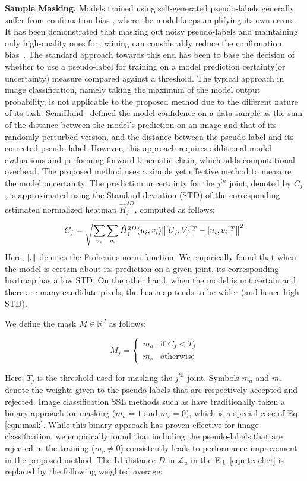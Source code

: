 \documentclass{article}
\begin{document}
\par
\textbf{Sample Masking.} Models trained using self-generated pseudo-labels generally suffer from confirmation bias \cite{tarvainen2017mean}, where the model keeps amplifying its own errors. It has been demonstrated that masking out noisy pseudo-labels and maintaining only high-quality ones for training can considerably reduce the confirmation bias~\cite{arazo2020pseudo}. The standard approach towards this end has been to base the decision of whether to use a pseudo-label for training on a model prediction certainty(or uncertainty) measure compared against a threshold. The typical approach in image classification, namely taking the maximum of the model output probability, is not applicable to the proposed method due to the different nature of its task. SemiHand~\cite{yang2021semihand} defined the model confidence on a data sample as the sum of the distance between the model's prediction on an image and that of its randomly perturbed version, and the distance between the pseudo-label and its corrected pseudo-label. However, this approach requires additional model evaluations and performing forward kinematic chain, which adds computational overhead. The proposed method uses a simple yet effective method to measure the model uncertainty. The prediction uncertainty for the $j^{th}$ joint, denoted by $C_j$, is approximated using the Standard deviation (STD) of the corresponding estimated normalized heatmap ${\hat{H}}_j^{2D}$, computed as follows:
\begin{equation}
  C_j = \sqrt{ \sum_{u_i}\sum_{v_i}{\hat{H}}_j^{2D}(u_i,v_i) \norm{[U_j,V_j]^T-[u_i,v_i]^T}^2 }
\end{equation}
Here, $\norm{.}$ denotes the Frobenius norm function. We empirically found that when the model is certain about its prediction on a given joint, its corresponding heatmap has a low STD. On the other hand, when the model is not certain and there are many candidate pixels, the heatmap tends to be wider (and hence high STD).
\par
We define the mask $M \in{\mathbb{R}^J}$ as follows:

\begin{equation}
\label{eqn:mask}
  M_j=
 \begin{cases}
    m_a & \text{if }C_j < T_j\\
    m_r               & \text{otherwise}
\end{cases}
\end{equation}

Here, $T_j$ is the threshold used for masking the $j^{th}$ joint. Symbols $m_a$ and $m_r$ denote the weights given to the pseudo-labels that are respectively accepted and rejected. Image classification SSL methods such as  \cite{sohn2020fixmatch,xie2019unsupervised,zhang2021flexmatch} have traditionally taken a binary approach for masking ($m_a = 1$ and $m_r = 0$), which is a special case of Eq. \ref{eqn:mask}. While this binary approach has proven effective for image classification, we empirically found that including 
the pseudo-labels that are rejected in the training ($m_r \neq 0$) consistently leads to performance improvement in the proposed method. The L1 distance $D$ in $\mathcal{L}_{u}$ in the Eq. \ref{eqn:teacher} is replaced by the following weighted average:
\end{document}
